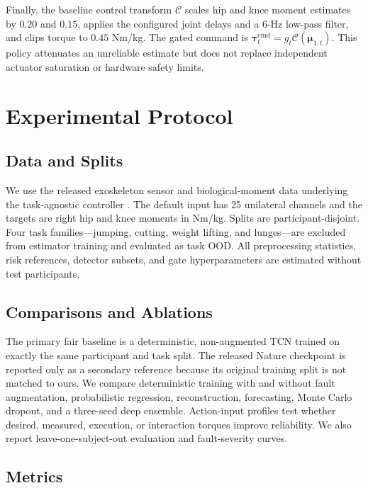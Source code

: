 \documentclass[letterpaper]{article} %
\begin{document}
Finally, the baseline control transform $\mathcal{C}$ scales hip and knee moment estimates by $0.20$ and $0.15$, applies the configured joint delays and a 6-Hz low-pass filter, and clips torque to $0.45$ Nm/kg.
The gated command is $\boldsymbol{\tau}^{\mathrm{cmd}}_t=g_t\mathcal{C}(\boldsymbol{\mu}_{1:t})$.
This policy attenuates an unreliable estimate but does not replace independent actuator saturation or hardware safety limits.

\section{Experimental Protocol}

\subsection{Data and Splits}

We use the released exoskeleton sensor and biological-moment data underlying the task-agnostic controller \citep{molinaro2024task,scherpereel2023dataset}.
The default input has 25 unilateral channels and the targets are right hip and knee moments in Nm/kg.
Splits are participant-disjoint.
Four task families---jumping, cutting, weight lifting, and lunges---are excluded from estimator training and evaluated as task OOD.
All preprocessing statistics, risk references, detector subsets, and gate hyperparameters are estimated without test participants.

\subsection{Comparisons and Ablations}

The primary fair baseline is a deterministic, non-augmented TCN trained on exactly the same participant and task split.
The released Nature checkpoint is reported only as a secondary reference because its original training split is not matched to ours.
We compare deterministic training with and without fault augmentation, probabilistic regression, reconstruction, forecasting, Monte Carlo dropout, and a three-seed deep ensemble.
Action-input profiles test whether desired, measured, execution, or interaction torques improve reliability.
We also report leave-one-subject-out evaluation and fault-severity curves.

\subsection{Metrics}
\end{document}
